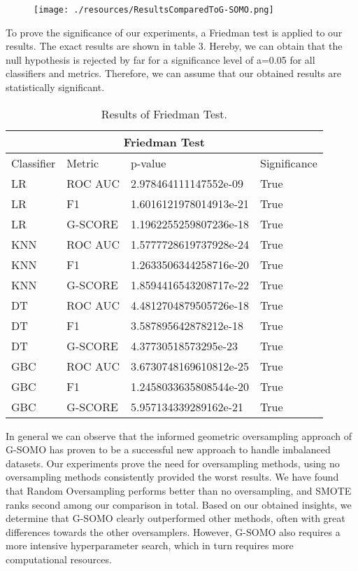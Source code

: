 \documentclass[parskip=full]{scrartcl}
\begin{document}
\begin{figure}[H]
	\centering
	\texttt{[image: ./resources/ResultsComparedToG-SOMO.png]}
	\label{fig:AvgScore}
\end{figure}

To prove the significance of our experiments, a Friedman test is applied to our results. The exact results 
are shown in table 3. Hereby, we can obtain that the null hypothesis is rejected by far for a significance 
level of a=0.05 for all classifiers and metrics. Therefore, we can assume that our obtained results are 
statistically significant. 

\begin{table} [h]
   \scriptsize
   \centering

\begin{tabular}{ |p{2cm}||p{2cm}|p{4cm}|p{2cm}|  }  
 \hline
 \multicolumn{4}{|c|}{Friedman Test} \\
 \hline
Classifier & Metric & p-value & Significance \\
 \hline
 
LR&	ROC AUC&	2.978464111147552e-09&	True\\
LR&	F1&	1.6016121978014913e-21&	True\\
LR&	G-SCORE&	1.1962255259807236e-18&	True\\
KNN&	ROC AUC&	1.5777728619737928e-24&	True\\
KNN&	F1&	1.2633506344258716e-20&	True\\
KNN&	G-SCORE&	1.8594416543208717e-22&	True\\
DT&	ROC AUC&	4.4812704879505726e-18&	True\\
DT&	F1&	3.587895642878212e-18&	True\\
DT&	G-SCORE&	4.37730518573295e-23&	True\\
GBC&	ROC AUC&	3.6730748169610812e-25&	True\\
GBC&	F1&	1.2458033635808544e-20&	True\\
GBC&	G-SCORE&	5.957134339289162e-21&	True\\

 \hline
\end{tabular}

\caption{Results of Friedman Test.}
   \label{tab:test}
\end{table} 

In general we can observe that the informed geometric oversampling approach of G-SOMO has proven 
to be a successful new approach to handle imbalanced datasets. Our experiments prove the need for 
oversampling methods, using no oversampling methods consistently provided the worst results. We 
have found that Random Oversampling performs better than no oversampling, and SMOTE ranks second 
among our comparison in total. Based on our obtained insights, we determine that G-SOMO clearly 
outperformed other methods, often with great differences towards the other oversamplers. However, 
G-SOMO also requires a more intensive hyperparameter search, which in turn requires more 
computational resources. 
\end{document}
